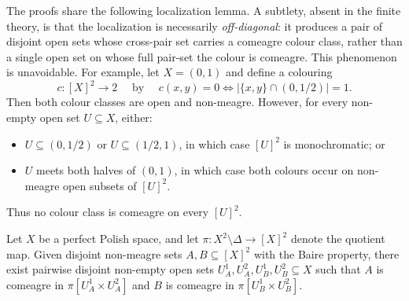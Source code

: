The proofs share the following localization lemma.
A subtlety, absent in the finite theory, is that the localization is necessarily \emph{off-diagonal}: it produces a pair of disjoint open sets whose cross-pair set carries a comeagre colour class, rather than a single open set on whose full pair-set the colour is comeagre.
This phenomenon is unavoidable.
For example, let $X=(0,1)$ and define a colouring $$c\colon[X]^2\to 2\quad\text{ by }\quad c(x,y)=0\iff|\{x,y\}\cap (0,1/2)|=1.$$
Then both colour classes are open and non-meagre.
However, for every non-empty open set $U\subseteq X$, either:
\begin{itemize}
    \item $U\subseteq (0,1/2)$ or $U\subseteq (1/2,1)$, in which case $[U]^2$ is monochromatic; or
    \item $U$ meets both halves of $(0,1)$, in which case both colours occur on non-meagre open subsets of $[U]^2$.
\end{itemize}
Thus no colour class is comeagre on every $[U]^2$.
 
\begin{lemma}\label{lemma:graph_localization}
    Let $X$ be a perfect Polish space, and let $\pi\colon X^2\setminus\Delta\to [X]^2$ denote the quotient map.
    Given disjoint non-meagre sets $A,B\subseteq [X]^2$ with the Baire property, there exist pairwise disjoint non-empty open sets $U_A^1,U_A^2,U_B^1,U_B^2\subseteq X$ such that $A$ is comeagre in $\pi[U_A^1\times U_A^2]$ and $B$ is comeagre in $\pi[U_B^1\times U_B^2]$.
\end{lemma}
 
